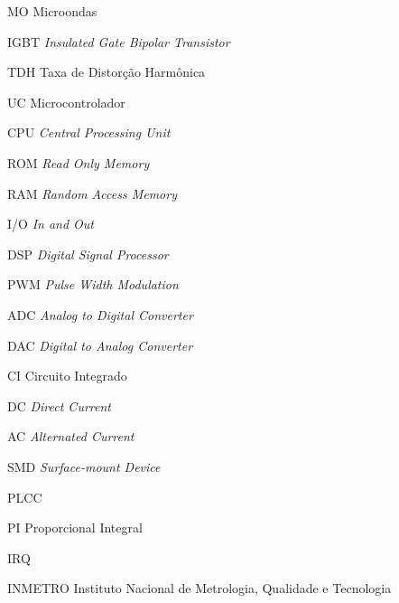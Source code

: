 
\begin{siglas}
    \item[MO] Microondas
    \item[IGBT] \textit{Insulated Gate Bipolar Transistor}
    \item[TDH] Taxa de Distorção Harmônica
    \item[UC] Microcontrolador
    \item[CPU] \textit{Central Processing Unit}
    \item[ROM] \textit{Read Only Memory}
    \item[RAM] \textit{Random Access Memory}
    \item[I/O] \textit{In and Out}
    \item[DSP] \textit{Digital Signal Processor}
    \item[PWM] \textit{Pulse Width Modulation}
    \item[ADC] \textit{Analog to Digital Converter}
    \item[DAC] \textit{Digital to Analog Converter}
    \item[CI] Circuito Integrado
    \item[DC] \textit{Direct Current}
    \item[AC] \textit{Alternated Current}
    \item[SMD] \textit{Surface-mount Device}
    \item[PLCC] 
    \item[PI] Proporcional Integral
    \item[IRQ] 
    \item[INMETRO] Instituto Nacional de Metrologia, Qualidade e Tecnologia
\end{siglas}

